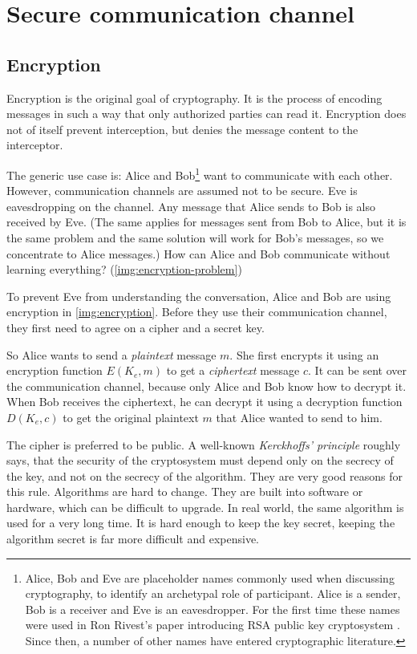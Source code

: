 \chapter{Secure communication channel}

\section{Encryption}

Encryption is the original goal of cryptography. It is the process of encoding messages in such a way that only authorized parties can read it. Encryption does not of itself prevent interception, but denies the message content to the interceptor.

The generic use case is: Alice and Bob\footnote{Alice, Bob and Eve are placeholder names commonly used when discussing cryptography, to identify an archetypal role of participant. Alice is a sender, Bob is a receiver and Eve is an eavesdropper. For the first time these names were used in Ron Rivest's paper introducing RSA public key cryptosystem . Since then, a number of other names have entered cryptographic literature.} want to communicate with each other. However, communication channels are assumed not to be secure. Eve is eavesdropping on the channel. Any message that Alice sends to Bob is also received by Eve. (The same applies for messages sent from Bob to Alice, but it is the same problem and the same solution will work for Bob's messages, so we concentrate to Alice messages.) How can Alice and Bob communicate without learning everything? (\autoref{img:encryption-problem}) \cite[p.~23]{ferguson2010cryptography}

To prevent Eve from understanding the conversation, Alice and Bob are using encryption in \autoref{img:encryption}. Before they use their communication channel, they first need to agree on a cipher and a secret key.

So Alice wants to send a \textit{plaintext} message $m$. She first encrypts it using an encryption function $E(K_e, m)$ to get a \textit{ciphertext} message $c$. It can be sent over the communication channel, because only Alice and Bob know how to decrypt it. When Bob receives the ciphertext, he can decrypt it using a decryption function $D(K_e, c)$ to get the original plaintext $m$ that Alice wanted to send to him.

The cipher is preferred to be public. A well-known \textit{Kerckhoffs' principle} roughly says, that the security of the cryptosystem must depend only on the secrecy of the key, and not on the secrecy of the algorithm. They are very good reasons for this rule. Algorithms are hard to change. They are built into software or hardware, which can be difficult to upgrade. In real world, the same algorithm is used for a very long time. It is hard enough to keep the key secret, keeping the algorithm secret is far more difficult and expensive.

